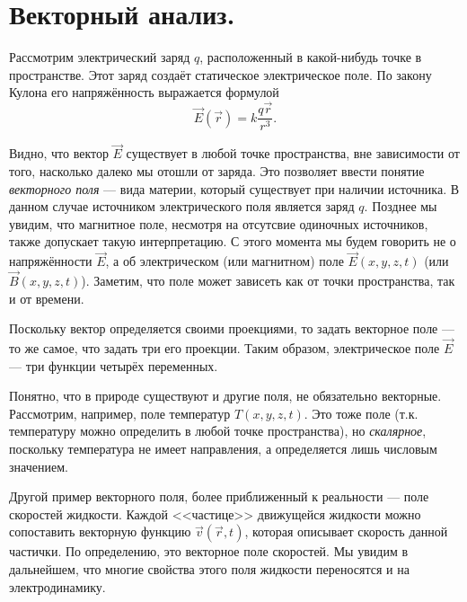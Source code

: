 \documentclass[12pt,a4paper]{article}
\numberwithin{equation}{section}
\numberwithin{equation}{section}
\begin{document}
\clearpage
\hypersetup{colorlinks,%
  linkcolor=black
}

\tableofcontents

\hypersetup{colorlinks,%
  citecolor=blue,
  urlcolor=blue,
  linkcolor=red
}

\clearpage 
\section{Векторный анализ.}

Рассмотрим электрический заряд $q$, расположенный в какой-нибудь точке
в пространстве. Этот заряд создаёт статическое электрическое поле. По
закону Кулона его напряжённость выражается формулой
\begin{equation}
  \label{eq:coulomb}
  \vec{E}(\vec{r}) =k \frac{q \vec{r}}{r^3}.
\end{equation}

Видно, что вектор $\vec{E}$ существует в любой точке пространства, вне
зависимости от того, насколько далеко мы отошли от заряда. Это
позволяет ввести понятие \textit{векторного поля} --- вида материи,
который существует при наличии источника. В данном случае источником
электрического поля является заряд $q$. Позднее мы увидим, что
магнитное поле, несмотря на отсутсвие одиночных источников, также
допускает такую интерпретацию. С этого момента мы будем говорить не о
напряжённости $\vec{E}$, а об электрическом (или магнитном) поле
$\vec{E}(x,y,z,t)$ (или $\vec{B}(x,y,z,t)$). Заметим, что поле может
зависеть как от точки пространства, так и от времени. 

Поскольку вектор определяется своими проекциями, то задать векторное
поле --- то же самое, что задать три его проекции. Таким образом,
электрическое поле $\vec{E}$ --- три функции четырёх переменных. 

Понятно, что в природе существуют и другие поля, не обязательно
векторные. Рассмотрим, например, поле температур $T(x,y,z,t)$. Это
тоже поле (т.к. температуру можно определить в любой точке
пространства), но \textit{скалярное}, поскольку температура не имеет
направления, а определяется лишь числовым значением. 

Другой пример векторного поля, более приближенный к реальности ---
поле скоростей жидкости. Каждой <<частице>> движущейся жидкости можно
сопоставить векторную функцию $\vec{v}(\vec{r},t)$, которая описывает
скорость данной частички. По определению, это векторное поле
скоростей. Мы увидим в дальнейшем, что многие свойства этого поля
жидкости переносятся и на электродинамику. 
\end{document}
